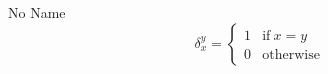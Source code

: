 \documentclass[a4paper,10pt]{article}
\newcommand\coolrightbrace[2]{%
\left.\vphantom{\begin{matrix} #1 \end{matrix}}\right\}#2}
\begin{document}
\begin{section}{No Name}
\begin{equation}
\delta_x^y=
\begin{cases}
1 & \textrm{if}~x=y\\
0 & \textrm{otherwise}
\end{cases}
\end{equation}













\end{section}
\end{document}

